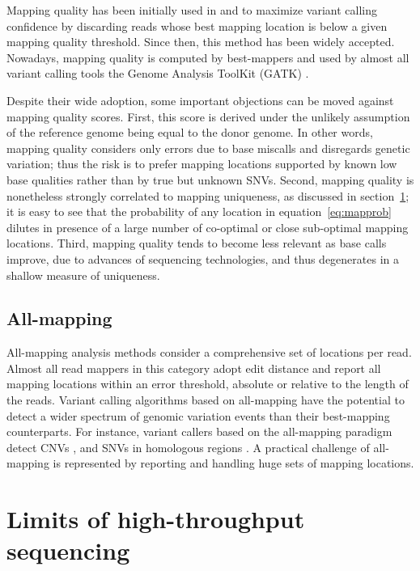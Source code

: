 Mapping quality has been initially used in \citep{Li2008} and \citep{Li2009} to maximize variant calling confidence by discarding reads whose best mapping location is below a given mapping quality threshold.
Since then, this method has been widely accepted.
Nowadays, mapping quality is computed by best-mappers and used by almost all variant calling tools \eg the Genome Analysis ToolKit (GATK) \citep{DePristo2011}.

Despite their wide adoption, some important objections can be moved against mapping quality scores.
First, this score is derived under the unlikely assumption of the reference genome being equal to the donor genome.
In other words, mapping quality considers only errors due to base miscalls and disregards genetic variation; thus the risk is to prefer mapping locations supported by known low base qualities rather than by true but unknown SNVs.
Second, mapping quality is nonetheless strongly correlated to mapping uniqueness, as discussed in section~\ref{sec:mappability}; it is easy to see that the probability of any location in equation~\ref{eq:mapprob} dilutes in presence of a large number of co-optimal or close sub-optimal mapping locations.
Third, mapping quality tends to become less relevant as base calls improve, due to advances of sequencing technologies, and thus degenerates in a shallow measure of uniqueness.

\subsection{All-mapping}
All-mapping analysis methods consider a comprehensive set of locations per read.
Almost all read mappers in this category adopt edit distance and report all mapping locations within an error threshold, absolute or relative \wrt to the length of the reads.
Variant calling algorithms based on all-mapping have the potential to detect a wider spectrum of genomic variation events than their best-mapping counterparts.
For instance, variant callers based on the all-mapping paradigm detect CNVs \citep{Alkan2009}, and SNVs in homologous regions \citep{Simola2011}.
A practical challenge of all-mapping is represented by reporting and handling huge sets of mapping locations.


\section{Limits of high-throughput sequencing}
\label{sec:mappability}


